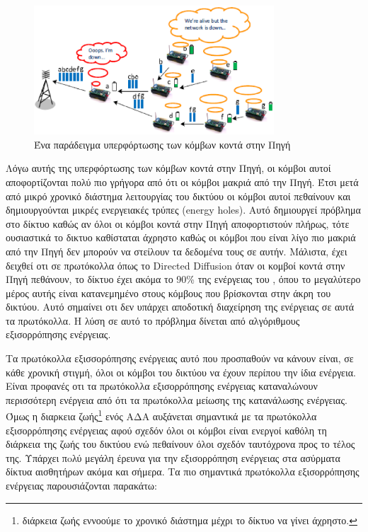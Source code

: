 \begin{figure}[h]
	\centering
	\includegraphics[width=0.8\textwidth]{images/energy_holes.eps}
	\caption{Ένα παράδειγμα υπερφόρτωσης των κόμβων κοντά στην Πηγή}
	\label{fig:energy_holes}
\end{figure}

Λόγω αυτής της υπερφόρτωσης των κόμβων κοντά στην Πηγή, οι κόμβοι αυτοί αποφορτίζονται πολύ πιο γρήγορα από ότι οι κόμβοι μακριά από την
Πηγή. Έτσι μετά από μικρό χρονικό διάστημα λειτουργίας του δικτύου οι κόμβοι αυτοί πεθαίνουν και δημιουργούνται μικρές ενεργειακές τρύπες (energy holes). Αυτό
δημιουργεί πρόβλημα στο δίκτυο καθώς αν όλοι οι κόμβοι κοντά στην Πηγή αποφορτιστούν πλήρως, τότε ουσιαστικά το δικτυο καθίσταται άχρηστο καθώς οι κόμβοι που είναι
λίγο πιο μακριά από την Πηγή δεν μπορούν να στείλουν τα δεδομένα τους σε αυτήν. Μάλιστα, έχει δειχθεί οτι σε πρωτόκολλα όπως το Directed Diffusion όταν οι κομβοί
κοντά στην Πηγή πεθάνουν, το δίκτυο έχει ακόμα το 90\% της ενέργειας του \cite{energy_holes}, όπου το μεγαλύτερο μέρος αυτής είναι κατανεμημένο στους κόμβους που
βρίσκονται στην άκρη του δικτύου. Αυτό σημαίνει οτι δεν υπάρχει αποδοτική διαχείρηση της ενέργειας σε αυτά τα πρωτόκολλα. Η λύση σε αυτό το πρόβλημα δίνεται από
αλγόριθμους εξισορρόπησης ενέργειας.

Τα πρωτόκολλα εξισσορόπησης ενέργειας αυτό που προσπαθούν να κάνουν είναι, σε κάθε χρονική στιγμή, όλοι οι κόμβοι του δικτύου να έχουν περίπου την ίδια ενέργεια.
Είναι προφανές οτι τα πρωτόκολλα εξισορρόπησης ενέργειας καταναλώνουν περισσότερη ενέργεια από ότι τα πρωτόκολλα μείωσης της κατανάλωσης ενέργειας. Όμως η διαρκεια
ζωής\footnote{διάρκεια ζωής εννοούμε το χρονικό διάστημα μέχρι το δίκτυο να γίνει άχρηστο.} ενός ΑΔΑ αυξάνεται σημαντικά με τα πρωτόκολλα εξισορρόπησης ενέργειας
αφού σχεδόν όλοι οι κόμβοι είναι ενεργοί καθόλη τη διάρκεια της ζωής του δικτύου ενώ πεθαίνουν όλοι σχεδόν ταυτόχρονα προς το τέλος της. Υπάρχει πoλύ μεγάλη έρευνα
για την εξισορρόπηση ενέργειας στα ασύρματα δίκτυα αισθητήρων ακόμα και σήμερα. Τα πιο σημαντικά πρωτόκολλα
εξισορρόπησης ενέργειας παρουσιάζονται παρακάτω:


